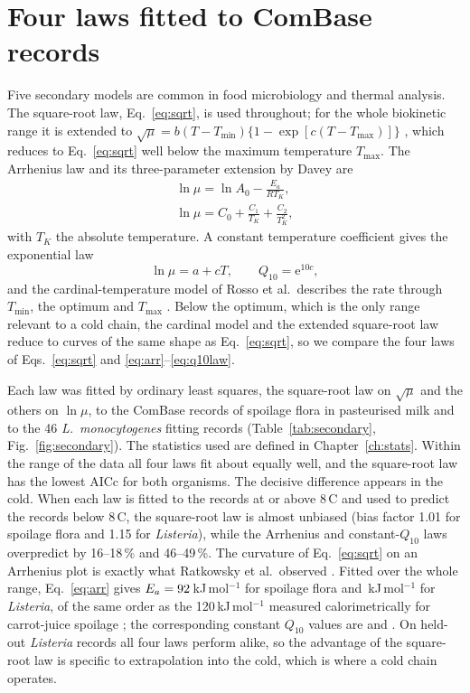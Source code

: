 \documentclass[11pt,a4paper,twoside,openany]{book}
\newcommand{\degC}{\,\textdegree C}
\theoremstyle{plain}\newtheorem{proposition}{Proposition}\newtheorem{corollary}{Corollary}
\theoremstyle{definition}\newtheorem{definition}{Definition}[chapter]
\begin{document}
\section{Four laws fitted to ComBase records}
Five secondary models are common in food microbiology and thermal analysis. The square-root law, Eq.~\eqref{eq:sqrt}, is used throughout; for the whole biokinetic range it is extended to $\sqrt{\mu}=b(T-T_{\min})\{1-\exp[c(T-T_{\max})]\}$ \cite{ratkowsky1982}, which reduces to Eq.~\eqref{eq:sqrt} well below the maximum temperature $T_{\max}$. The Arrhenius law and its three-parameter extension by Davey are
\begin{gather}
\ln\mu=\ln A_0-\frac{E_a}{RT_K},\label{eq:arr}\\
\ln\mu=C_0+\frac{C_1}{T_K}+\frac{C_2}{T_K^2},\label{eq:davey}
\end{gather}
with $T_K$ the absolute temperature. A constant temperature coefficient gives the exponential law
\begin{equation}\label{eq:q10law}
\ln\mu=a+cT,\qquad Q_{10}=\mathrm{e}^{10c},
\end{equation}
and the cardinal-temperature model of Rosso et al.\ describes the rate through $T_{\min}$, the optimum and $T_{\max}$ \cite{rosso1993}. Below the optimum, which is the only range relevant to a cold chain, the cardinal model and the extended square-root law reduce to curves of the same shape as Eq.~\eqref{eq:sqrt}, so we compare the four laws of Eqs.~\eqref{eq:sqrt} and \eqref{eq:arr}--\eqref{eq:q10law}.

Each law was fitted by ordinary least squares, the square-root law on $\sqrt{\mu}$ and the others on $\ln\mu$, to the \NumCbN{} ComBase records of spoilage flora in pasteurised milk and to the 46 \textit{L.~monocytogenes} fitting records (Table~\ref{tab:secondary}, Fig.~\ref{fig:secondary}). The statistics used are defined in Chapter~\ref{ch:stats}. Within the range of the data all four laws fit about equally well, and the square-root law has the lowest AICc for both organisms. The decisive difference appears in the cold. When each law is fitted to the records at or above 8\degC{} and used to predict the records below 8\degC, the square-root law is almost unbiased (bias factor 1.01 for spoilage flora and 1.15 for \textit{Listeria}), while the Arrhenius and constant-$Q_{10}$ laws overpredict by 16--18\,\% and 46--49\,\%. The curvature of Eq.~\eqref{eq:sqrt} on an Arrhenius plot is exactly what Ratkowsky et al.\ observed \cite{ratkowsky1982}. Fitted over the whole range, Eq.~\eqref{eq:arr} gives $E_a=92$\,kJ\,mol$^{-1}$ for spoilage flora and \SecEaLis\,kJ\,mol$^{-1}$ for \textit{Listeria}, of the same order as the 120\,kJ\,mol$^{-1}$ measured calorimetrically for carrot-juice spoilage \cite{wadso2011}; the corresponding constant $Q_{10}$ values are \SecQtenSp{} and \SecQtenLis. On held-out \textit{Listeria} records all four laws perform alike, so the advantage of the square-root law is specific to extrapolation into the cold, which is where a cold chain operates.
\end{document}
